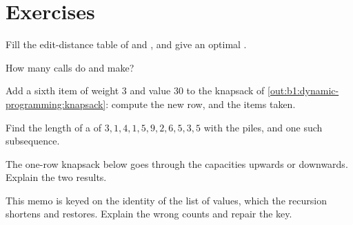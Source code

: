 \section{Exercises}\label{sec:b1:dynamic-programming:exercises}

\begin{exercise}[$\star$]\label{exo:b1:dynamic-programming:1}
Fill the edit-distance table of  and , and give an optimal .
\end{exercise}

\begin{exercise}[$\star$]\label{exo:b1:dynamic-programming:2}
How many calls do  and  make?
\end{exercise}

\begin{exercise}[$\star$]\label{exo:b1:dynamic-programming:3}
Add a sixth item of weight 3 and value 30 to the knapsack of \cref{out:b1:dynamic-programming:knapsack}: compute the new
row, and the items taken.
\end{exercise}

\begin{exercise}[$\star$]\label{exo:b1:dynamic-programming:4}
Find the length of a  of $3, 1, 4, 1, 5, 9, 2, 6, 5, 3, 5$ with the piles, and one such
subsequence.
\end{exercise}

\begin{exercise}[$\star\star$]\label{exo:b1:dynamic-programming:5}
The one-row knapsack below goes through the capacities upwards or downwards. Explain the two results.
\end{exercise}

\begin{exercise}[$\star\star$]\label{exo:b1:dynamic-programming:6}
This memo is keyed on the identity of the list of values, which the recursion shortens and restores. Explain the wrong
counts and repair the key.
\end{exercise}

